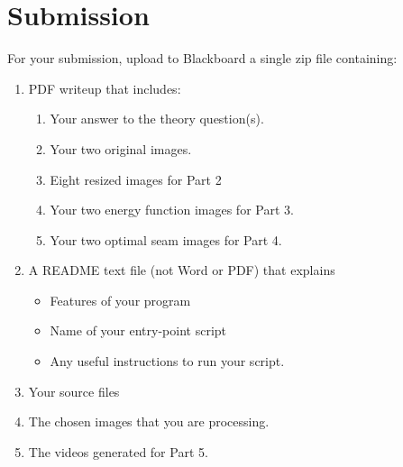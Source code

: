 \documentclass[12pt]{article}
\begin{document}
\newpage
\section*{Submission}
For your submission, upload to Blackboard a single zip file containing:

\begin{enumerate}
\item PDF writeup that includes:
\begin{enumerate}
\item Your answer to the theory question(s).
\item Your two original images.
\item Eight resized images for Part 2
\item Your two energy function images for Part 3.
\item Your two optimal seam images for Part 4.
\end{enumerate}
\item A README text file (not Word or PDF) that explains
\begin{itemize}
\item Features of your program
\item Name of your entry-point script
\item Any useful instructions to run your script.
\end{itemize}
\item Your source files
\item The chosen images that you are processing.
\item The videos generated for Part 5.
\end{enumerate}
\end{document}
